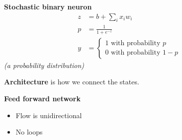 \bigskip
\textbf{Stochastic binary neuron}
\begin{align*}
  z & = b + \sum_i x_i w_i \\[2mm]
  p &= \frac{1}{1+e^{-z}} \\[3mm]
  y & = \left\{
      \begin{array}{l}
        1  \text{ with probability } p \\[2mm]
        0  \text{ with probability } 1 - p
      \end{array}
  \right.
\end{align*}
\textit{(a probability distribution)}





\textbf{Architecture} is how we connect the states.

\textbf{Feed forward network}
\begin{itemize}
\item Flow is unidirectional
\item No loops
\end{itemize}



